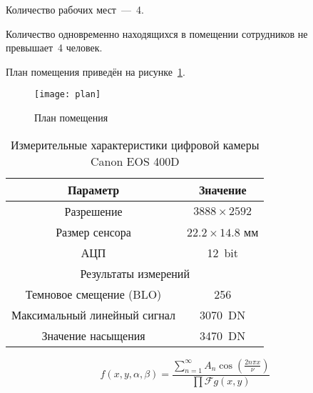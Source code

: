 Количество рабочих мест~---~4.

Количество одновременно находящихся в помещении сотрудников не превышает~4 человек.

План помещения приведён на рисунке~\ref{image:room_plan}.
\begin{figure}[h]
\texttt{[image: plan]}
\caption{План помещения}\label{image:room_plan}
\end{figure}

\begin{table}[h]
\caption{\label{tab:canonsummary}Измерительные характеристики цифровой камеры Canon EOS 400D}
\begin{tabular}{|c|c|}
\hline
Параметр & Значение \\
\hline
Разрешение & $3888 \times 2592$ \\
Размер сенсора & $22.2 \times 14.8$ мм \\
АЦП & 12~bit\\
\hline
\multicolumn{2}{|c|}{Результаты измерений} \\
\hline
Темновое смещение (BLO) & 256 \\
Максимальный линейный сигнал & 3070~DN \\
Значение насыщения & 3470~DN \\
\hline
\end{tabular}
\end{table} 

\begin{equation} 
f(x,y,\alpha, \beta) = \frac{\sum \limits_{n=1}^{\infty} 
A_n \cos \left( \frac{2 n \pi x}{\nu} \right)} {\prod \mathcal{F} {g(x,y)} } 
\end{equation}